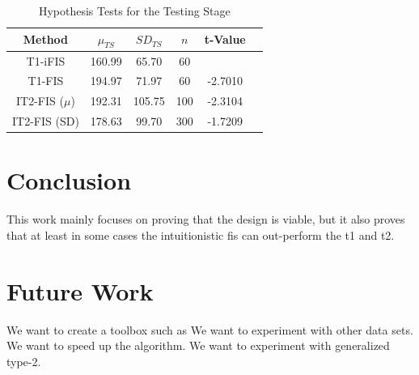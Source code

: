\documentclass[conference]{IEEEtran}
\begin{document}
\begin{table}[!t]
  \renewcommand{\arraystretch}{1.3}
  \caption{Hypothesis Tests for the Testing Stage}
  \label{hypothesis-tests}
  \centering
  \begin{tabular}{|c|c|c|c|c|c|}
    \hline
    Method & $\mu_{TS}$ & $SD_{TS}$ & $n$ & t-Value\\
    \hline
    T1-iFIS & 160.99 & 65.70 & 60 & \\
    \hline
    T1-FIS & 194.97 & 71.97 & 60 & -2.7010 \\
    \hline
    IT2-FIS (\(\mu\)) & 192.31 & 105.75 & 100 & -2.3104 \\
    \hline
    IT2-FIS (SD) & 178.63 & 99.70 & 300 & -1.7209 \\
    \hline
  \end{tabular}
\end{table}

\section{Conclusion}

This work mainly focuses on proving that the design is viable, but it
also proves that at least in some cases the intuitionistic fis can
out-perform the t1 and t2.

\section{Future Work}

We want to create a toolbox such as \cite{castro2007interval}
We want to experiment with other data sets.
We want to speed up the algorithm.
We want to experiment with generalized type-2.



\end{document}

